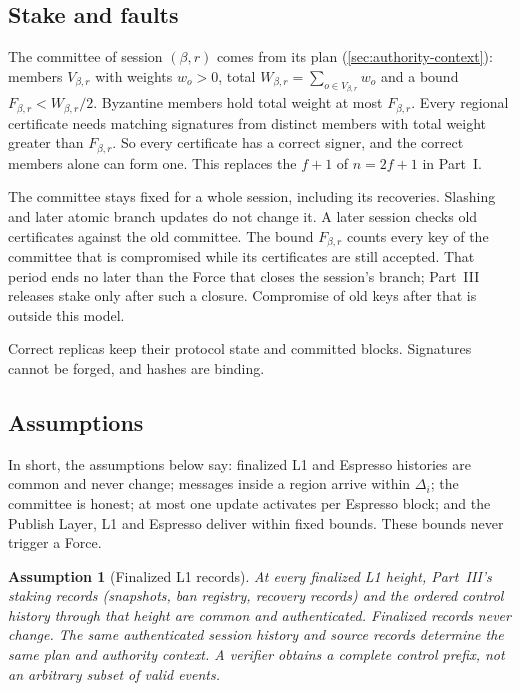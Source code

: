 \documentclass[11pt,a4paper]{article}
\newtheorem{assumption}[assumption]{Assumption}
\newcounter{protocol}
\begin{document}
\subsection{Stake and faults}
\label{sec:stake}
The committee of session $(\beta,r)$ comes from its plan
(\cref{sec:authority-context}): members $V_{\beta,r}$ with weights
$w_o>0$, total $W_{\beta,r}=\sum_{o\in V_{\beta,r}}w_o$ and a bound
$F_{\beta,r}<W_{\beta,r}/2$. Byzantine members hold total weight at most
$F_{\beta,r}$. Every regional certificate needs matching signatures from
distinct members with total weight greater than $F_{\beta,r}$. So every
certificate has a correct signer, and the correct members alone can form
one. This replaces the $f+1$ of $n=2f+1$ in Part~I.

The committee stays fixed for a whole session, including its recoveries.
Slashing and later atomic branch updates do not change it. A later session
checks old certificates against the old committee. The bound
$F_{\beta,r}$ counts every key of the committee that is compromised while
its certificates are still accepted. That period ends no later than the
Force that closes the session's branch; Part~III releases stake only
after such a closure. Compromise of old keys after that is outside this
model.

Correct replicas keep their protocol state and committed blocks.
Signatures cannot be forged, and hashes are binding.

\subsection{Assumptions}
\label{sec:assumptions}
In short, the assumptions below say: finalized L1 and Espresso histories
are common and never change; messages inside a region arrive within
$\Delta_i$; the committee is honest; at most one update activates per
Espresso block; and the Publish Layer, L1 and Espresso deliver within
fixed bounds. These bounds never trigger a Force.
\begin{assumption}[Finalized L1 records]
\label{ass:authority}
At every finalized L1 height, Part~III's staking records (snapshots, ban
registry, recovery records) and the ordered control history through that
height are common and authenticated. Finalized records never change. The
same authenticated session history and source records determine the same
plan and authority context. A verifier obtains a complete control
prefix, not an arbitrary subset of valid events.
\end{assumption}
\end{document}
